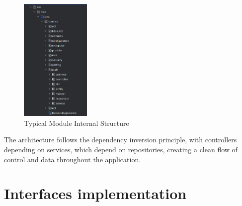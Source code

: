 \begin{figure}[H]
  \centering
  \includegraphics[width=0.3\textwidth]{graphics/sys-design/backend_folder_structure_2.png}
  \caption{Typical Module Internal Structure}
  \label{fig:module_structure}
\end{figure}

The architecture follows the dependency inversion principle, with controllers depending on services, which depend on repositories, creating a clean flow of control and data throughout the application.

\section{Interfaces implementation}